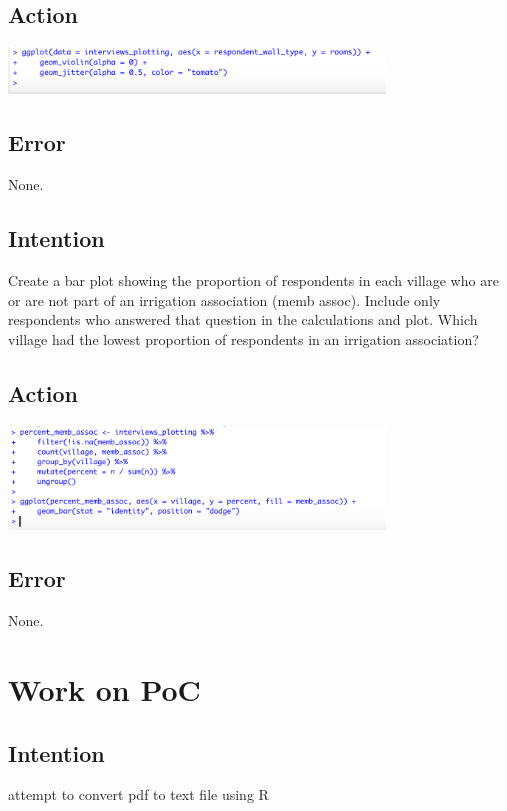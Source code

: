 \documentclass{article}
\begin{document}
\subsection{Action}

\includegraphics[width=10cm]{geom_violin.png}

\subsection{Error}
None.

\subsection{Intention}
Create a bar plot showing the proportion of respondents in each village who are or are not part of an irrigation association (memb assoc). Include only respondents who answered that question in the calculations and plot. Which village had the lowest proportion of respondents in an irrigation association?

\subsection{Action}
\includegraphics[width=10cm]{bar_plot.png}

\subsection{Error}
None.

\section{Work on PoC}

\subsection{Intention}
attempt to convert pdf to text file using R 
\end{document}
